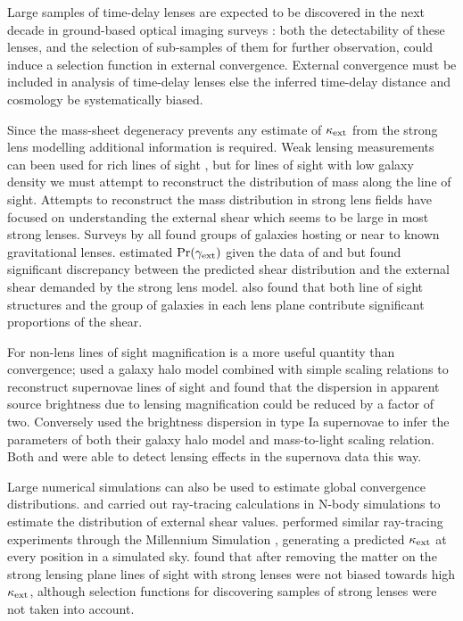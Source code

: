 \documentclass[useAMS,usenatbib]{mn2e}
\begin{document}
Large samples
of time-delay lenses are expected to be discovered in the next decade in
ground-based optical imaging surveys \citep{Oguri+Marshall2010}: both
the detectability of these lenses, and the selection of sub-samples of
them for further observation, could induce a selection function in external
convergence. External convergence must be included in analysis of time-delay
lenses else the inferred time-delay distance and cosmology be systematically biased.

Since the mass-sheet degeneracy prevents any estimate of $\kappa_{\rm ext}$ from the 
strong lens modelling additional information is required. Weak lensing measurements
can been used for rich lines of sight \citep{NakajimaEtal2009, FadelyEtal2009}, but 
for lines of sight with low galaxy density we must attempt to reconstruct the distribution
of mass along the line of sight. Attempts to reconstruct the mass distribution in strong
lens fields have focused on understanding the external shear which seems to be large in most strong lenses.
Surveys by \citet{Fassnacht+Lubin2002,AugerEtal2007,WilliamsEtal2006,MomchevaEtal2006}
all found groups of galaxies hosting or near to known gravitational lenses.
\citet{WongEtal2011} estimated $\Pr(\gamma_{\rm ext})$ given the data of \citet{WilliamsEtal2006}
and \citet{MomchevaEtal2006} but found significant discrepancy between the predicted shear
distribution and the external shear demanded by the strong lens model. 
\citeauthor{WongEtal2011} also found that both line of
sight structures and the group of galaxies in each lens plane contribute
significant proportions of the shear. 

For non-lens lines of sight magnification is a more useful quantity than convergence; \citet{GunnarssonEtal2006} used a galaxy halo model combined with simple scaling relations to reconstruct supernovae
lines of sight and found that the dispersion in
apparent source brightness due to lensing magnification could be reduced
by a factor of two. Conversely \citet{KarpenkaEtal2012} used the brightness dispersion in type Ia supernovae to infer the parameters of both their galaxy halo model and mass-to-light scaling relation. Both \citeauthor{KarpenkaEtal2012} and \citet{JonssonEtal2010} were able to 
detect lensing effects in the supernova data this way.

Large numerical simulations can also be used to estimate global convergence distributions.
 \citet{Holder+Schechter2003} and
\citet{DalalEtal2005} carried out ray-tracing calculations in N-body
simulations to estimate the distribution of external shear values. 
\citet{HilbertEtal2009} performed similar ray-tracing experiments
through the Millennium Simulation \citep{SpringelEtal2005}, generating a
predicted $\kappa_{\rm ext}$ at every position in a simulated sky.
\citet{HilbertEtal2009} found that after removing the matter on the strong lensing plane
\MS lines of sight with strong lenses
were not biased towards high $\kappa_{\rm ext}$, although selection functions for
discovering samples of strong lenses were not taken
into account.
\end{document}
